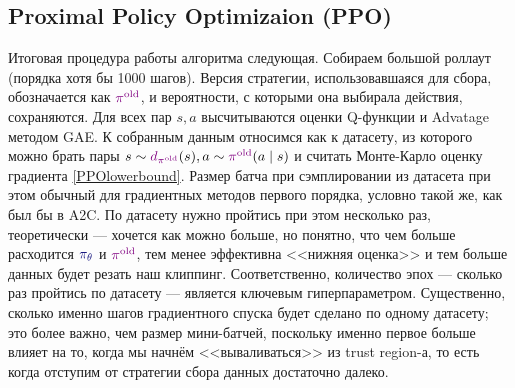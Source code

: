 \subsection{Proximal Policy Optimizaion (PPO)}

Итоговая процедура работы алгоритма следующая. Собираем большой роллаут (порядка хотя бы 1000 шагов). Версия стратегии, использовавшаяся для сбора, обозначается как $\textcolor{ChadPurple}{\pi^{\old}}$, и вероятности, с которыми она выбирала действия, сохраняются. Для всех пар $s, a$ высчитываются оценки Q-функции и Advatage методом GAE. К собранным данным относимся как к датасету, из которого можно брать пары $s \sim \textcolor{ChadPurple}{d_{\pi^{\old}}}(s), a \sim \textcolor{ChadPurple}{\pi^{\old}}(a \mid s)$ и считать Монте-Карло оценку градиента \eqref{PPOlowerbound}. Размер батча при сэмплировании из датасета при этом обычный для градиентных методов первого порядка, условно такой же, как был бы в A2C. По датасету нужно пройтись при этом несколько раз, теоретически --- хочется как можно больше, но понятно, что чем больше расходится $\textcolor{ChadBlue}{\pi_\theta}$ и $\textcolor{ChadPurple}{\pi^{\old}}$, тем менее эффективна <<нижняя оценка>> и тем больше данных будет резать наш клиппинг. Соответственно, количество эпох --- сколько раз пройтись по датасету --- является ключевым гиперпараметром. Существенно, сколько именно шагов градиентного спуска будет сделано по одному датасету; это более важно, чем размер мини-батчей, поскольку именно первое больше влияет на то, когда мы начнём <<вываливаться>> из trust region-а, то есть когда отступим от стратегии сбора данных достаточно далеко. 


